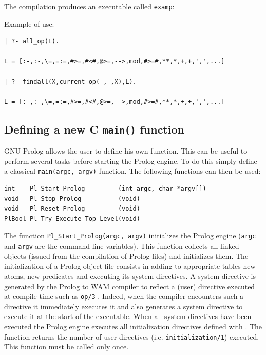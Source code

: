 The compilation produces an executable called \texttt{examp}:


Example of use:

\begin{Code}
\begin{verbatim}
| ?- all_op(L).

L = [:-,:-,\=,=:=,#>=,#<#,@>=,-->,mod,#>=#,**,*,+,+,',',...]

| ?- findall(X,current_op(_,_,X),L).

L = [:-,:-,\=,=:=,#>=,#<#,@>=,-->,mod,#>=#,**,*,+,+,',',...]
\end{verbatim}
\end{Code}


\subsection{Defining a new C \texttt{main()} function}

GNU Prolog allows the user to define his own 
function. This can be useful to perform several tasks before starting
the Prolog engine. To do this simply define a classical
\texttt{main(argc, argv)} function. The following functions can then be used:

\begin{Code}
\begin{verbatim}
int    Pl_Start_Prolog         (int argc, char *argv[])
void   Pl_Stop_Prolog          (void)
void   Pl_Reset_Prolog         (void)
PlBool Pl_Try_Execute_Top_Level(void)
\end{verbatim}
\end{Code}

The function \texttt{Pl\_Start\_Prolog(argc, argv)} initializes the Prolog
engine (\texttt{argc} and \texttt{argv} are the command-line variables). This
function collects all linked objects (issued from the compilation of Prolog
files) and initializes them. The initialization of a Prolog object file
consists in adding to appropriate tables new atoms, new predicates and
executing its system directives. A system directive is generated by the
Prolog to WAM compiler to reflect a (user) directive executed at compile-time
such as \texttt{op/3} . Indeed, when the compiler encounters such
a directive it immediately executes it and also generates a system directive
to execute it at the start of the executable.  When all system directives
have been executed the Prolog engine executes all initialization directives
defined with 
. The function returns the number of user
directives (i.e. \texttt{initialization/1}) executed. This function must be
called only once.

